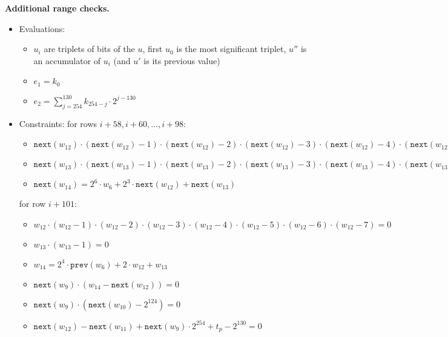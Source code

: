 \textbf{Additional range checks.}
\begin{itemize}
    \item Evaluations:
        \begin{itemize}
            \item $u_i$ are triplets of bits of the $u$, first $u_0$ is the most significant triplet, $u''$ is an accumulator of $u_i$ (and $u'$ is its previous value)
            \item $e_1= k_0$
            \item $e_2=\sum_{j=254}^{130} k_{254-j} \cdot 2^{j-130}  $
        \end{itemize}

    \item Constraints:
        for rows $i+58, i+60, \dots, i+98$:
        \begin{itemize}
            \item $\texttt{next}(w_{12}) \cdot (\texttt{next}(w_{12}) - 1) \cdot (\texttt{next}(w_{12}) - 2) \cdot (\texttt{next}(w_{12}) - 3) \cdot (\texttt{next}(w_{12}) - 4) \cdot (\texttt{next}(w_{12}) - 5) \cdot (\texttt{next}(w_{12}) - 6) \cdot (\texttt{next}(w_{12}) - 7)= 0$
            \item $\texttt{next}(w_{13}) \cdot (\texttt{next}(w_{13}) - 1) \cdot (\texttt{next}(w_{13}) - 2) \cdot (\texttt{next}(w_{13}) - 3) \cdot (\texttt{next}(w_{13}) - 4) \cdot (\texttt{next}(w_{13}) - 5) \cdot (\texttt{next}(w_{13}) - 6) \cdot (\texttt{next}(w_{13}) - 7)= 0$
            \item $\texttt{next}(w_{14}) = 2^6\cdot w_6 + 2^3 \cdot \texttt{next}(w_{12}) + \texttt{next}(w_{13})$
        \end{itemize}

        for row $i+101$:
        \begin{itemize}
            \item $w_{12} \cdot (w_{12} - 1) \cdot (w_{12} - 2) \cdot (w_{12} - 3) \cdot (w_{12} - 4) \cdot (w_{12} - 5) \cdot (w_{12} - 6) \cdot (w_{12} - 7)= 0$
            \item $w_{13} \cdot (w_{13} - 1) = 0$
            \item $w_{14} = 2^4\cdot \texttt{prev}(w_6) + 2 \cdot w_{12} + w_{13}$
            \item $\texttt{next}(w_{9}) \cdot (w_{14}-\texttt{next}(w_{12})) = 0$
            \item $\texttt{next}(w_{9}) \cdot (\texttt{next}(w_{10}) -2^{124}) = 0$
            \item $\texttt{next}(w_{12}) - \texttt{next}(w_{11}) +  \texttt{next}(w_{9}) \cdot 2^{254} + t_p -2^{130} = 0$
        \end{itemize}
\end{itemize}

